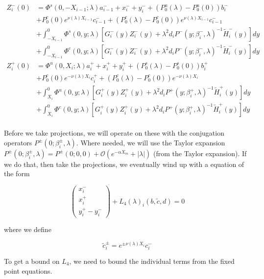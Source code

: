 \documentclass[12pt]{article}
\begin{document}
\begin{align*}
Z_i^-(0) &= \Phi^s(0, -X_{i-1}; \lambda) a_{i-1}^- + x_i^- + y_i^- + (P_0^u(\lambda) - P_0^u(0))b_i^- \\
&+ P_0^c(0) e^{\nu(\lambda) X_{i-1}} c_{i-1}^- + (P_0^c(\lambda) - P_0^c(0)) e^{\nu(\lambda) X_{i-1}} c_{i-1}^- \\
&+ \int_{-X_{i-1}}^0 \Phi^s(0, y; \lambda) [G_i^-(y)Z_i^-(y) + \lambda^2 d_i P^-(y; \beta_i^-, \lambda)^{-1} \tilde{H}_i^-(y)] dy \\
&+ \int_{-X_{i-1}}^0 \Phi^c(0, y; \lambda) [G_i^-(y)Z_i^-(y) + \lambda^2 d_i P^-(y; \beta_i^-, \lambda)^{-1} \tilde{H}_i^-(y)] dy  \\ 
Z_i^+(0) &= \Phi^u(0, X_i; \lambda) a_i^+ + x_i^+ + y_i^+ + (P_0^s(\lambda) - P_0^s(0)) b_i^+ \\
&+ P_0^c(0) e^{-\nu(\lambda)X_i} c_i^+ + (P_0^c(\lambda) - P_0^c(0)) e^{-\nu(\lambda)X_i} \\
&+ \int_{X_i}^0 \Phi^u(0, y; \lambda) [G_i^+(y)Z_i^+(y) + \lambda^2 d_i P^+(y; \beta_i^+, \lambda)^{-1} \tilde{H}_i^+(y) ] dy \\
&+ \int_{X_i}^0 \Phi^c(0, y; \lambda) [G_i^+(y)Z_i^+(y) + \lambda^2 d_i P^+(y; \beta_i^+, \lambda)^{-1} \tilde{H}_i^+(y) ] dy \\
\end{align*}
 
Before we take projections, we will operate on these with the conjugation operators $P^\pm(0; \beta_i^\pm, \lambda)$. Where needed, we will use the Taylor expansion $P^\pm(0; \beta_i^\pm, \lambda) = P^\pm(0; 0, 0) + \mathcal{O}(e^{-\alpha X_m} + |\lambda|)$ (from the Taylor expansion). If we do that, then take the projections, we eventually wind up with a equation of the form

\[
\begin{pmatrix}x_i^- \\ x_i^+ \\ 
y_i^+ - y_i^- \end{pmatrix} + L_4(\lambda)_i(b, \tilde{c}, d) = 0
\]

where we define

\begin{equation}\label{tildec}
\tilde{c}_i^\pm = e^{\pm \nu(\lambda) X_i} c_i^-
\end{equation}

To get a bound on $L_4$, we need to bound the individual terms from the fixed point equations.
\end{document}
